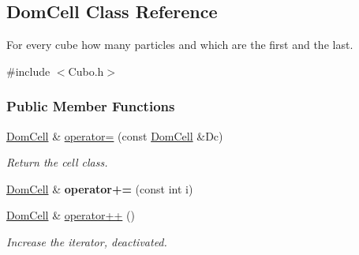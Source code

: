 \hypertarget{classDomCell}{\subsection{\-Dom\-Cell \-Class \-Reference}
\label{classDomCell}
}


\-For every cube how many particles and which are the first and the last.  




{\ttfamily \#include $<$\-Cubo.\-h$>$}

\subsubsection*{\-Public \-Member \-Functions}
\begin{DoxyCompactItemize}
\item 
\hypertarget{classDomCell_adc9b4853c13b6aeef8c0100c42ca2ec2}{\hyperlink{classDomCell}{\-Dom\-Cell} \& \hyperlink{classDomCell_adc9b4853c13b6aeef8c0100c42ca2ec2}{operator=} (const \hyperlink{classDomCell}{\-Dom\-Cell} \&\-Dc)}\label{classDomCell_adc9b4853c13b6aeef8c0100c42ca2ec2}

\begin{DoxyCompactList}\small\item\em \-Return the cell class. \end{DoxyCompactList}\item 
\hypertarget{classDomCell_ae3b231faf50835be1440642d5eca0269}{\hyperlink{classDomCell}{\-Dom\-Cell} \& {\bfseries operator+=} (const int i)}\label{classDomCell_ae3b231faf50835be1440642d5eca0269}

\item 
\hypertarget{classDomCell_ab51a086364b690c5a35890cc25d2ae1e}{\hyperlink{classDomCell}{\-Dom\-Cell} \& \hyperlink{classDomCell_ab51a086364b690c5a35890cc25d2ae1e}{operator++} ()}\label{classDomCell_ab51a086364b690c5a35890cc25d2ae1e}

\begin{DoxyCompactList}\small\item\em \-Increase the iterator, deactivated. \end{DoxyCompactList}\end{DoxyCompactItemize}

